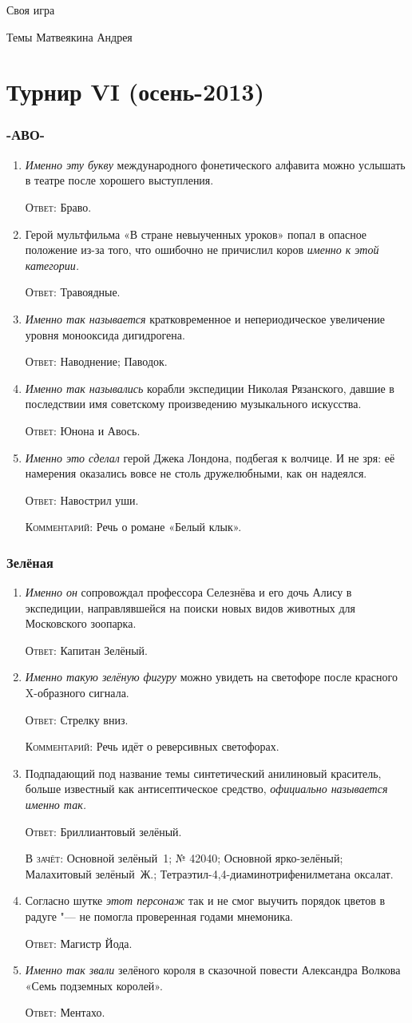 \documentclass[a4paper,10pt]{article}
\let\keyword\textsc
\newenvironment{topic}{\begin{enumerate}}{\end{enumerate}}
\newcommand{\question}[3]{\item[#1.] #2 \par \keyword{Ответ:} #3}
\newcommand{\alternative}[1]{\par \keyword{В зачёт:} #1}
\newcommand{\commentary}[1]{\par \keyword{Комментарий:} #1}
\begin{document}
\begin{center}
 \Huge Своя игра
 \medskip

 \Large Темы Матвеякина Андрея
\end{center}
\bigskip


\tableofcontents

\newpage
\part{Турнир VI (осень-2013)}

\section{-АВО-}

\begin{topic}
 \question{10}{\emph{Именно эту букву} международного фонетического алфавита можно услышать в театре после хорошего выступления.}{Браво.}
 \question{20}{Герой мультфильма «В стране невыученных уроков» попал в опасное положение из-за того, что ошибочно не причислил коров \emph{именно к этой категории.}}{Травоядные.}
 \question{30}{\emph{Именно так называется} кратковременное и непериодическое увеличение уровня монооксида дигидрогена.}{Наводнение; Паводок.}
 \question{40}{\emph{Именно так назывались} корабли экспедиции Николая Рязанского, давшие в последствии имя советскому произведению музыкального искусства.}{Юнона и Авось.}
 \question{50}{\emph{Именно это сделал} герой Джека Лондона, подбегая к волчице. И не зря: её намерения оказались вовсе не столь дружелюбными, как он надеялся.}{Навострил уши.}\commentary{Речь о романе «Белый клык».}
\end{topic}


\section{Зелёная}

\begin{topic}
 \question{10}{\emph{Именно он} сопровождал профессора Селезнёва и его дочь Алису в экспедиции, направлявшейся на поиски новых видов животных для Московского зоопарка.}{Капитан Зелёный.}
 \question{20}{\emph{Именно такую зелёную фигуру} можно увидеть на светофоре после красного X-образного сигнала.}{Стрелку вниз.}\commentary{Речь идёт о реверсивных светофорах.}
 \question{30}{Подпадающий под название темы синтетический анилиновый краситель, больше известный как антисептическое средство, \emph{официально называется именно так.}}{Бриллиантовый зелёный.}\alternative{Основной зелёный~1; № 42040; Основной ярко-зелёный; Малахитовый зелёный~Ж.; Тетраэтил-4,4-диаминотрифенилметана оксалат.}
 \question{40}{Согласно шутке \emph{этот персонаж} так и не смог выучить порядок цветов в радуге "--- не помогла проверенная годами мнемоника.}{Магистр Йода.}
 \question{50}{\emph{Именно так звали} зелёного короля в сказочной повести Александра Волкова «Семь подземных королей».}{Ментахо.}
\end{topic}
\end{document}
